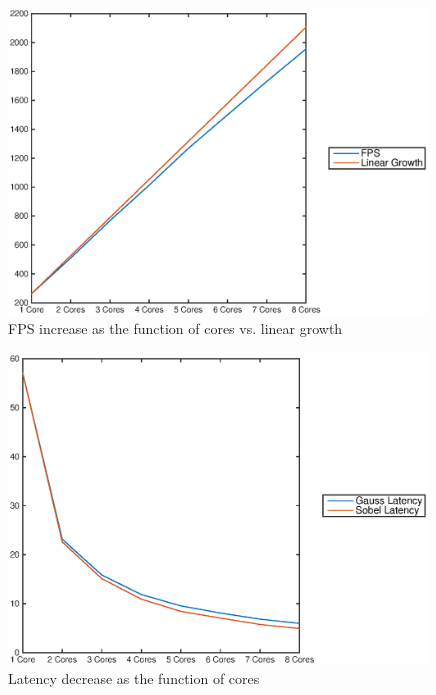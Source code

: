 \begin{figure}[h!]
    \begin{center}
        \includegraphics[width=0.99\textwidth]{images/coremask_fps.eps}
        \caption{FPS increase as the function of cores vs. linear growth}
    \end{center}
\end{figure}

\begin{figure}[h!]
    \begin{center}
        \includegraphics[width=0.99\textwidth]{images/coremask_latencies.eps}
        \caption{Latency decrease as the function of cores}
        \label{fig:latencyvcores}
    \end{center}
\end{figure}

